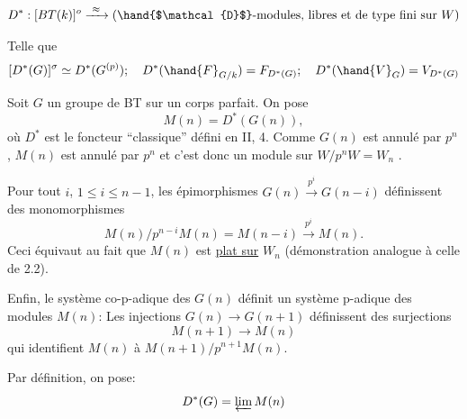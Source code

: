 
\[ D^{*}: [BT(k)]^{o} \xrightarrow{\ \approx\ } ( \hand{$\mathcal{D}$}\text{-modules, libres et de type fini sur } W) \]

Telle que
\[ [D^{*}(G)]^{\sigma} \simeq D^{*}(G^{(p)}) ; \quad D^{*}(\hand{F}_{G/k}) = F_{D^{*}(G)} ; \quad D^{*}(\hand{V}_{G}) = V_{D^{*}(G)} \]

Soit $G$ un groupe de BT sur un corps parfait. On pose
\[ M(n) = D^{*}(G(n)), \]
où $D^{*}$ est le foncteur ``classique'' défini en II, 4. Comme $G(n)$ est
annulé par $p^{n}$, $M(n)$ est annulé par $p^{n}$ et c'est donc un module sur
$W/p^{n}W = W_{n}$ .

Pour tout $i$, $1 \leq i \leq n-1$, les épimorphismes $G(n) \xrightarrow{p^{i}} G(n-i)$
définissent des monomorphismes
\[ M(n)/p^{n-i}M(n) = M(n-i) \xrightarrow{p^{i}} M(n) . \]
Ceci équivaut au fait que $M(n)$ est \uline{plat sur} $W_{n}$ (démonstration analogue
à celle de 2.2).

Enfin, le système co-p-adique des $G(n)$ définit un système
p-adique des modules $M(n)$: Les injections $G(n) \rightarrow G(n+1)$ définissent
des surjections
\[ M(n+1) \rightarrow M(n) \]
qui identifient $M(n)$ à $M(n+1)/p^{n+1}M(n)$.

Par définition, on pose:
\[ D^{*}(G) = \varprojlim M(n) \]

